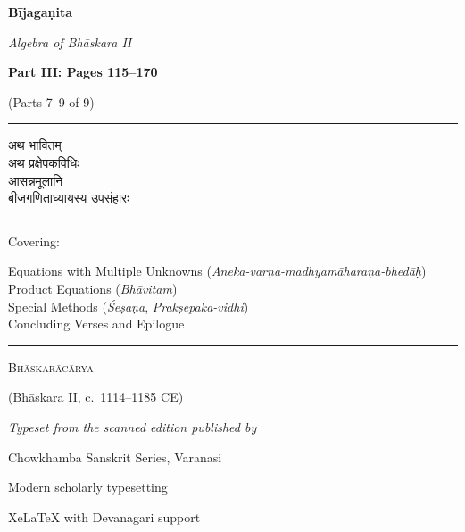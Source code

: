 \documentclass[11pt,a4paper]{article}
\newcommand{\shortline}{\noindent\rule{0.5\textwidth}{0.4pt}\par}
\begin{document}
\begin{titlepage}
\centering
\vspace*{2cm}

{\Huge\bfseries\color{titlecolor} Bījagaṇita\par}
\vspace{0.5cm}
{\Large\itshape Algebra of Bhāskara II\par}
\vspace{1.5cm}

{\LARGE\bfseries Part III: Pages 115--170\par}
\vspace{0.5cm}
{\large (Parts 7--9 of 9)\par}
\vspace{1cm}

\shortline
\vspace{0.5cm}

{\large\devanagarifont
अथ भावितम्\\[0.3em]
अथ प्रक्षेपकविधिः\\[0.3em]
आसन्नमूलानि\\[0.3em]
बीजगणिताध्यायस्य उपसंहारः
}

\vspace{0.5cm}

\shortline
\vspace{1cm}

{\large Covering:\par}
\vspace{0.3cm}
{\normalsize
\begin{minipage}{0.8\textwidth}
\centering
Equations with Multiple Unknowns (\textit{Aneka-varṇa-madhyamāharaṇa-bhedāḥ})\\[0.3em]
Product Equations (\textit{Bhāvitam})\\[0.3em]
Special Methods (\textit{Śeṣaṇa}, \textit{Prakṣepaka-vidhi})\\[0.3em]
Concluding Verses and Epilogue
\end{minipage}
\par}
\vspace{1cm}

\shortline
\vspace{1cm}

{\large\scshape Bhāskarācārya}\par
{\normalsize (Bhāskara II, c.\ 1114--1185 CE)\par}
\vspace{1.5cm}

{\small\textit{Typeset from the scanned edition published by}}\\[0.3em]
{\small Chowkhamba Sanskrit Series, Varanasi\par}

\vfill
{\small Modern scholarly typesetting\par}
{\footnotesize XeLaTeX with Devanagari support\par}

\end{titlepage}
\end{document}
